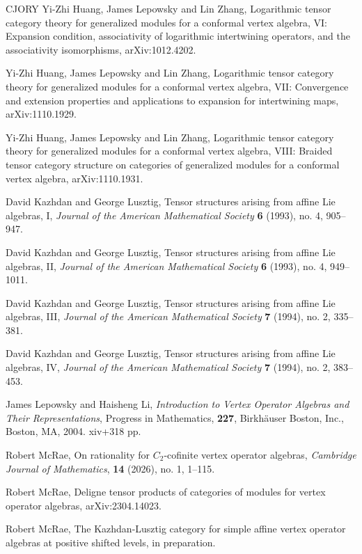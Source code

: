 \documentclass[11pt, reqno]{amsart}
\theoremstyle{definition}\newtheorem{defi}[thm]{Definition}
\theoremstyle{definition}\newtheorem{rem}[thm]{Remark}
\theoremstyle{definition}\newtheorem{exam}[thm]{Example}
\theoremstyle{definition}\newtheorem{assum}[thm]{Assumption}
\begin{document}
\begin{thebibliography}{CJORY}
Yi-Zhi Huang, James Lepowsky and Lin Zhang, Logarithmic tensor category theory for
generalized modules for a conformal vertex algebra, VI: Expansion condition,
associativity of logarithmic intertwining operators, and the associativity
isomorphisms, arXiv:1012.4202.
	
Yi-Zhi Huang, James Lepowsky and Lin Zhang, Logarithmic tensor category theory for
generalized modules for a conformal vertex algebra, VII: Convergence and
extension properties and applications to expansion for intertwining maps,
arXiv:1110.1929.
	
Yi-Zhi Huang, James Lepowsky and Lin Zhang, Logarithmic tensor category theory for
generalized modules for a conformal vertex algebra, VIII: Braided tensor
category structure on categories of generalized modules for a conformal vertex
algebra, arXiv:1110.1931.

David Kazhdan and George Lusztig, Tensor structures arising from affine Lie algebras, 
I, \textit{Journal of the American Mathematical Society} \textbf{6} (1993), no. 4, 905--947.

David Kazhdan and George Lusztig, Tensor structures arising from affine Lie algebras, 
II, \textit{Journal of the American Mathematical Society} \textbf{6} (1993), no. 4, 949--1011.

David Kazhdan and George Lusztig, Tensor structures arising from affine Lie algebras, 
III, \textit{Journal of the American Mathematical Society} \textbf{7} (1994), no. 2, 335--381.

David Kazhdan and George Lusztig, Tensor structures arising from affine Lie algebras, 
IV, \textit{Journal of the American Mathematical Society} \textbf{7} (1994), no. 2, 383--453.

James Lepowsky and Haisheng Li, \textit{Introduction to Vertex
Operator Algebras and Their Representations}, Progress in Mathematics, \textbf{227}, Birkh\"{a}user Boston, Inc., Boston, MA, 2004. xiv+318 pp.

Robert McRae, On rationality for $C_2$-cofinite vertex operator algebras, \textit{Cambridge Journal of Mathematics}, \textbf{14} (2026), no. 1, 1--115.

 Robert McRae, Deligne tensor products of categories of modules for vertex operator algebras, arXiv:2304.14023.

 Robert McRae, The Kazhdan-Lusztig category for simple affine vertex operator algebras at positive shifted levels, in preparation.


\end{thebibliography}
\end{document}
